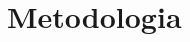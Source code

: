 \documentclass[12pt]{article}
\begin{document}
		
		
		
		
		\section{Metodologia}
		
		
\end{document}
